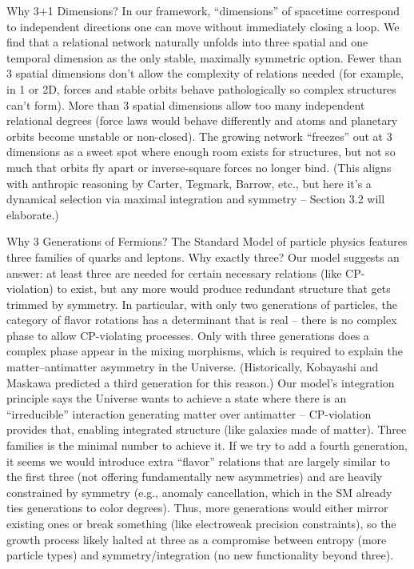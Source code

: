 \documentclass{article}
\begin{document}
Why 3+1 Dimensions? In our framework, “dimensions” of spacetime correspond to independent directions one can move without immediately closing a loop. We find that a relational network naturally unfolds into three spatial and one temporal dimension as the only stable, maximally symmetric option. Fewer than 3 spatial dimensions don’t allow the complexity of relations needed (for example, in 1 or 2D, forces and stable orbits behave pathologically so complex structures can’t form\cite{tegmark1997}). More than 3 spatial dimensions allow too many independent relational degrees (force laws would behave differently and atoms and planetary orbits become unstable or non-closed)\cite{tegmark1997}. The growing network “freezes” out at 3 dimensions as a sweet spot where enough room exists for structures, but not so much that orbits fly apart or inverse-square forces no longer bind. (This aligns with anthropic reasoning by Carter, Tegmark, Barrow, etc., but here it’s a dynamical selection via maximal integration and symmetry – Section 3.2 will elaborate.)

Why 3 Generations of Fermions? The Standard Model of particle physics features three families of quarks and leptons. Why exactly three? Our model suggests an answer: at least three are needed for certain necessary relations (like CP-violation) to exist, but any more would produce redundant structure that gets trimmed by symmetry. In particular, with only two generations of particles, the category of flavor rotations has a determinant that is real – there is no complex phase to allow CP-violating processes. Only with three generations does a complex phase appear in the mixing morphisms, which is required to explain the matter–antimatter asymmetry in the Universe\cite{kobayashi1973}. (Historically, Kobayashi and Maskawa predicted a third generation for this reason\cite{kobayashi1973}.) Our model’s integration principle says the Universe wants to achieve a state where there is an “irreducible” interaction generating matter over antimatter – CP-violation provides that, enabling integrated structure (like galaxies made of matter). Three families is the minimal number to achieve it. If we try to add a fourth generation, it seems we would introduce extra “flavor” relations that are largely similar to the first three (not offering fundamentally new asymmetries) and are heavily constrained by symmetry (e.g., anomaly cancellation, which in the SM already ties generations to color degrees). Thus, more generations would either mirror existing ones or break something (like electroweak precision constraints), so the growth process likely halted at three as a compromise between entropy (more particle types) and symmetry/integration (no new functionality beyond three).
\end{document}
